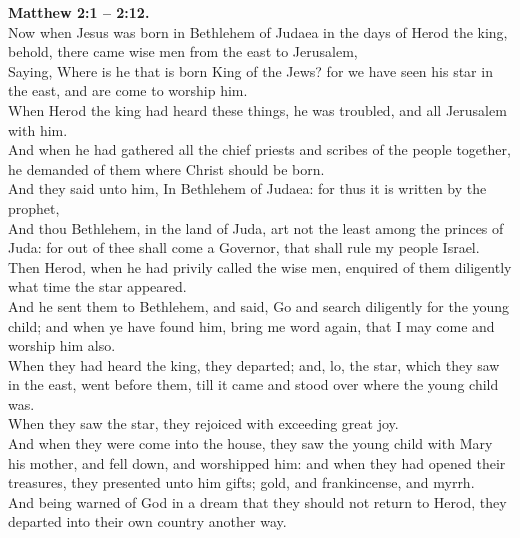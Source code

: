 \documentclass[10pt]{article} %
\begin{document}
{\begin{minipage}[t]{0.45\textwidth}
\textbf{Matthew 2:1 -- 2:12.}\\
Now when Jesus was born in Bethlehem of Judaea in the days of Herod the king, behold, there came wise men from the east to Jerusalem,\\
Saying, Where is he that is born King of the Jews? for we have seen his star in the east, and are come to worship him.\\
When Herod the king had heard these things, he was troubled, and all Jerusalem with him.\\
And when he had gathered all the chief priests and scribes of the people together, he demanded of them where Christ should be born.\\
And they said unto him, In Bethlehem of Judaea: for thus it is written by the prophet,\\
And thou Bethlehem, in the land of Juda, art not the least among the princes of Juda: for out of thee shall come a Governor, that shall rule my people Israel.\\
Then Herod, when he had privily called the wise men, enquired of them diligently what time the star appeared.\\
And he sent them to Bethlehem, and said, Go and search diligently for the young child; and when ye have found him, bring me word again, that I may come and worship him also.\\
When they had heard the king, they departed; and, lo, the star, which they saw in the east, went before them, till it came and stood over where the young child was.\\
When they saw the star, they rejoiced with exceeding great joy.\\
And when they were come into the house, they saw the young child with Mary his mother, and fell down, and worshipped him: and when they had opened their treasures, they presented unto him gifts; gold, and frankincense, and myrrh.\\
And being warned of God in a dream that they should not return to Herod, they departed into their own country another way.\\
\end{minipage}}
\newpage\huge
\vspace*{\fill}
\singlespacing %
\end{document}
